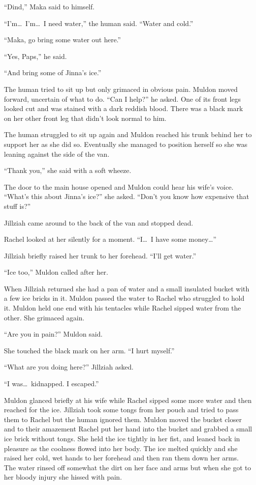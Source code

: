 ``Dind,'' Maka said to himself.

``I'm\ldots\ I'm\ldots\ I need water,'' the human said. ``Water and cold.''

``Maka, go bring some water out here.''

``Yes, Paps,'' he said.

``And bring some of Jinna's ice.''

The human tried to sit up but only grimaced in obvious pain. Muldon moved forward, uncertain of
what to do. ``Can I help?'' he asked. One of its front legs looked cut and was stained with a
dark reddish blood. There was a black mark on her other front leg that didn't look normal to
him.

The human struggled to sit up again and Muldon reached his trunk behind her to support her as
she did so. Eventually she managed to position herself so she was leaning against the side of
the van.

``Thank you,'' she said with a soft wheeze.

The door to the main house opened and Muldon could hear his wife's voice. ``What's this about
Jinna's ice?'' she asked. ``Don't you know how expensive that stuff is?''

Jillziah came around to the back of the van and stopped dead.

Rachel looked at her silently for a moment. ``I\ldots\ I have some money\ldots''

Jillziah briefly raised her trunk to her forehead. ``I'll get water.''

``Ice too,'' Muldon called after her.

When Jillziah returned she had a pan of water and a small insulated bucket with a few ice bricks
in it. Muldon passed the water to Rachel who struggled to hold it. Muldon held one end with his
tentacles while Rachel sipped water from the other. She grimaced again.

``Are you in pain?'' Muldon said.

She touched the black mark on her arm. ``I hurt myself.''

``What are you doing here?'' Jillziah asked.

``I was\ldots\ kidnapped. I escaped.''

Muldon glanced briefly at his wife while Rachel sipped some more water and then reached for the
ice. Jillziah took some tongs from her pouch and tried to pass them to Rachel but the human
ignored them. Muldon moved the bucket closer and to their amazement Rachel put her hand into the
bucket and grabbed a small ice brick without tongs. She held the ice tightly in her fist, and
leaned back in pleasure as the coolness flowed into her body. The ice melted quickly and she
raised her cold, wet hands to her forehead and then ran them down her arms. The water rinsed off
somewhat the dirt on her face and arms but when she got to her bloody injury she hissed with
pain.

